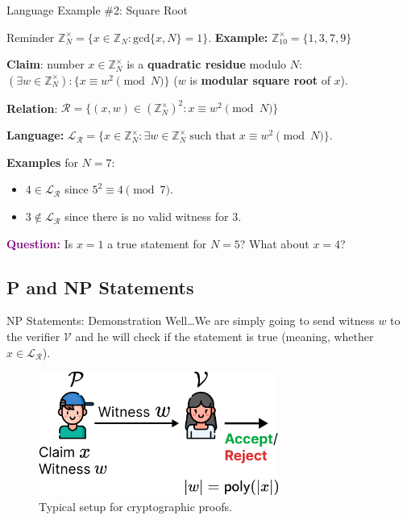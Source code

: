 \documentclass[xcolor={usenames,dvipsnames}]{beamer}
\begin{document}
    \begin{frame}{Language Example \#2: Square Root}
        \begin{block}{Reminder}
            $\mathbb{Z}_N^{\times} = \{x \in \mathbb{Z}_N: \text{gcd}\{x,N\}=1\}$. \textbf{Example:} $\mathbb{Z}_{10}^{\times} = \{1,3,7,9\}$
        \end{block}

        \begin{example}
            \textbf{Claim}: number $x \in \mathbb{Z}_N^{\times}$ is a \textbf{quadratic residue} modulo $N$: $(\exists w \in \mathbb{Z}_N^{\times}): \{x \equiv w^2 \pmod{N}\}$ ($w$ is \textbf{modular square root} of $x$). 
            
            \textbf{Relation}: $\mathcal{R} = \{ (x, w) \in (\mathbb{Z}_N^{\times})^2: x \equiv w^2 \pmod{N} \}$
        
            \textbf{Language:} $\mathcal{L}_{\mathcal{R}} = \{x \in \mathbb{Z}_N^{\times}: \exists w \in \mathbb{Z}_N^{\times} \; \text{such that} \; x \equiv w^2 \pmod{N}\}$. 
            
            \textbf{Examples} for $N=7$: 
            \begin{itemize}
                \item $4 \in \mathcal{L}_{\mathcal{R}}$ since $5^2 \equiv 4 \pmod{7}$. 
                \item $3 \not\in \mathcal{L}_{\mathcal{R}}$ since there is no valid witness for $3$.
            \end{itemize}
        \end{example}

        \textcolor{purple}{\textbf{Question:}} Is $x=1$ a true statement for $N=5$? What about $x=4$?
    \end{frame}

    \subsection{P and NP Statements}

    \begin{frame}{NP Statements: Demonstration}
        Well\ldots We are simply going to send witness $w$ to the verifier $\mathcal{V}$ and he will check if the statement is true (meaning, whether $x \in \mathcal{L}_{\mathcal{R}}$).

        \begin{figure}
            \centering
            \includegraphics[width=0.7\textwidth]{images/lecture_6/np.pdf}
            \caption{Typical setup for cryptographic proofs.}
        \end{figure}
    \end{frame}
\end{document}
